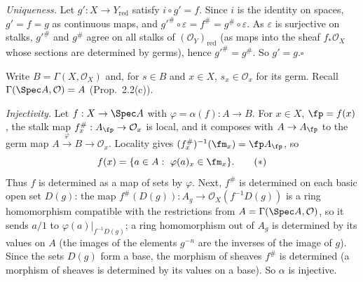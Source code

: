 \documentclass[11pt]{article}
\begin{document}
\emph{Uniqueness.} Let $g':X\to Y_{\mathrm{red}}$ satisfy $i\circ g'=f$. Since $i$ is the identity on spaces, $g'=f=g$ as continuous maps, and $g'^\#\circ\varepsilon=f^\#=g^\#\circ\varepsilon$. As $\varepsilon$ is surjective on stalks, $g'^\#$ and $g^\#$ agree on all stalks of $(\mathcal O_Y)_{\mathrm{red}}$ (as maps into the sheaf $f_*\mathcal O_X$ whose sections are determined by germs), hence $g'^\#=g^\#$. So $g'=g$.\hfill$\square$

\pf
Write $B=\Gamma(X,\mathcal O_X)$ and, for $s\in B$ and $x\in X$, $s_x\in\mathcal O_x$ for its germ. Recall $\Gamma(\Spec A,\mathcal O)=A$ (Prop.~2.2(c)).

\emph{Injectivity.} Let $f:X\to\Spec A$ with $\varphi=\alpha(f):A\to B$. For $x\in X$, $\fp=f(x)$, the stalk map $f^\#_x:A_\fp\to\mathcal O_x$ is local, and it composes with $A\to A_\fp$ to the germ map $A\xrightarrow{\varphi}B\to\mathcal O_x$. Locality gives $(f^\#_x)^{-1}(\fm_x)=\fp A_\fp$, so
\[f(x)=\{a\in A:\ \varphi(a)_x\in\fm_x\}.\tag{$*$}\]
Thus $f$ is determined as a map of sets by $\varphi$. Next, $f^\#$ is determined on each basic open set $D(g)$: the map $f^\#(D(g)):A_g\to\mathcal O_X(f^{-1}D(g))$ is a ring homomorphism compatible with the restrictions from $A=\Gamma(\Spec A,\mathcal O)$, so it sends $a/1$ to $\varphi(a)|_{f^{-1}D(g)}$; a ring homomorphism out of $A_g$ is determined by its values on $A$ (the images of the elements $g^{-n}$ are the inverses of the image of $g$). Since the sets $D(g)$ form a base, the morphism of sheaves $f^\#$ is determined (a morphism of sheaves is determined by its values on a base). So $\alpha$ is injective.
\end{document}
